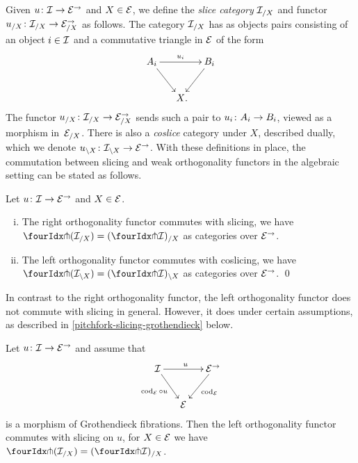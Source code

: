 \documentclass[reqno,10pt,a4paper,oneside,draft]{amsart}
\begin{document}
{{Given $u \co \cal{I} \to \catE^\to$ and $X \in \catE$, we define the \emph{slice category} $\cal{I}_{/X}$ and functor $u_{/X} \co \cal{I}_{/X} \to \catE_{/X}^\to$ as follows.
The category $\cal{I}_{/X}$ has as objects pairs consisting of an object $i \in \cal{I}$ and a commutative triangle in $\catE$ of the form
\[
\xymatrix@C-1em{
  A_i
  \ar[dr]
  \ar[rr]^{u_i}
&&
  B_i
  \ar[dl]
\\&
  X
\rlap{.}}
\]
The functor $u_{/X} \co \cal{I}_{/X} \to \catE_{/X}^\to$ sends such a pair to $u_i \co A_i \to B_i$, viewed as a morphism in~$\catE_{/X}$.
There is also a \emph{coslice} category under $X$, described dually, which we denote $u_{\backslash X} \co  \cal{I}_{\backslash X} \to \catE^\to$.
With these definitions in place, the commutation between slicing and weak orthogonality functors in the algebraic setting can be stated as follows.

\begin{proposition} \label{pitchfork-slicing}
Let $u \co \cal{I} \to \catE^\to$ and $X \in \cal{E}$.
\begin{enumerate}[(i)]
\item The right orthogonality functor commutes with slicing, \ie we have $\liftr{(\cal{I}_{/X})} = (\liftr{\cal{I}})_{/X}$ as categories over $\catE^\to$.
\item The left orthogonality functor commutes with coslicing, \ie we have $\liftl{(\cal{I}_{\backslash X})} = (\liftl{\cal{I}})_{\backslash X}$ as categories over $\catE^\to$.
\qed
\end{enumerate}
\end{proposition}

In contrast to the right orthogonality functor, the left orthogonality functor does not commute with slicing in general.
However, it does under certain assumptions, as described in \cref{pitchfork-slicing-grothendieck} below.

\begin{proposition} \label{pitchfork-slicing-grothendieck}
Let $u \co \cal{I} \to \cal{E}^\to$ and assume that
\[
\xymatrix@C-1em{
  \cal{I}
  \ar[rr]^{u}
  \ar[dr]_{\cod_{\cal{E}} \cc u}
&&
  \cal{E}^\to
  \ar[dl]^{\cod_{\cal{E}}}
\\&
  \cal{E}
}
\]
is a morphism of Grothendieck fibrations.
Then the left orthogonality functor commutes with slicing on $u$, \ie for $X \in \cal{E}$ we have
$\liftl{(\cal{I}_{/X})} = (\liftl{\cal{I}})_{/X}$.
\end{proposition}

}}
\end{document}
